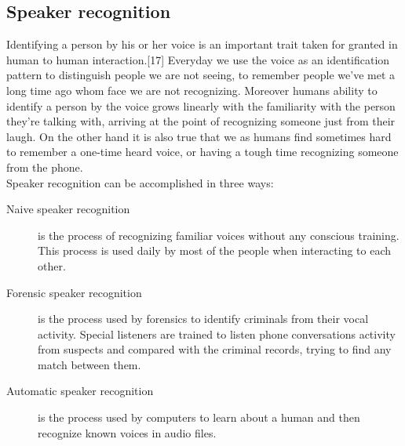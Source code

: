 \subsection{Speaker recognition}
Identifying a person by his or her voice is an important trait taken for granted
in human to human interaction.[17] Everyday we use the voice as an identification pattern
to distinguish people we are not seeing, to remember people
we've met a long time ago whom face we are not recognizing.
Moreover humans ability to identify a person by the voice grows linearly
with the familiarity with the person they're talking with, arriving at the point
of recognizing someone just from their laugh. On the other hand it is
also true that we as humans find sometimes hard to remember a one-time heard voice,
or having a tough time recognizing someone from the phone.\\
Speaker recognition can be accomplished in three ways:
\begin{description}
    \item[Naive speaker recognition] is the process of recognizing familiar
    voices without any conscious training. This process is used daily by most of the people
    when interacting to each other.
    \item[Forensic speaker recognition] is the process used by forensics to identify
    criminals from their vocal activity. Special listeners are trained to listen phone
    conversations activity from suspects and compared with the criminal records, trying
    to find any match between them.
    \item[Automatic speaker recognition] is the process used by computers to learn
    about a human and then recognize known voices in audio files.
\end{description}

